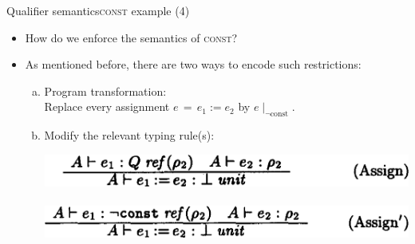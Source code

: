 \documentclass{beamer}
\begin{document}
\begin{frame}{Qualifier semantics}{\textsc{const} example (4)}
  \begin{itemize}
  \item How do we enforce the semantics of \textsc{const}?
  \item<2-> As mentioned before, there are two ways to encode such restrictions:
    \begin{enumerate}[a)]
    \item<2-> Program transformation:\\ Replace every assignment $e\,=\,e_1\!:=\!e_2$ by $e\!\mid_{\neg\text{const}}$.
    \item<3-> Modify the relevant typing rule(s):\\
      \begin{center}
      \includegraphics[scale=0.25]{paper_assign_original.png}\\
      \vspace{0.5em}{\Huge $\Downarrow$}\hspace{5.8em}\vspace{0.5em}\\
      \includegraphics[scale=0.25]{paper_assign_adapted.png}
      \end{center}
    \end{enumerate}
  \end{itemize}
\end{frame}
\end{document}
